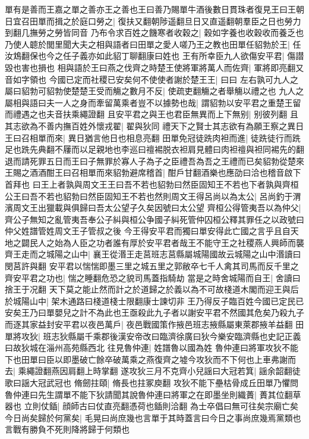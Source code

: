 單有是善而王嘉之單之善亦王之善也王曰善乃賜單牛酒後數日貫珠者復見王曰王朝日宜召田單而揖之於庭口勞之|{
	復扶又翻朝陟遥翻旦日又直遥翻朝羣臣之日也勞力到翻几撫勞之勞皆同音}
乃布令求百姓之饑寒者收穀之|{
	穀如字養也收穀收而養乏也}
乃使人聼於閭里聞大夫之相與語者曰田單之愛人嗟乃王之教也田單任貂勃於王|{
	任汝鴆翻保也今之任子義亦如此貂丁聊翻康曰姓也}
王有所幸臣九人欲傷安平君|{
	傷譛毀也害也損也}
相與語於王曰燕之伐齊之時楚王使將軍將萬人而佐齊|{
	軍將即亮翻又音如字領也}
今國已定而社稷已安矣何不使使者謝於楚王王|{
	曰曰}
左右孰可九人之屬曰貂勃可貂勃使楚楚王受而觴之數月不反|{
	使疏吏翻觴之者舉觴以禮之也}
九人之屬相與語曰夫一人之身而牽留萬乘者豈不以據勢也哉|{
	謂貂勃以安平君之重楚王留而禮遇之也夫音扶乘繩證翻}
且安平君之與王也君臣無異而上下無别|{
	别彼列翻}
且其志欲為不善内撫百姓外懷戎翟|{
	翟與狄同}
禮天下之賢士其志欲有為願王察之異日王曰召相單而來|{
	異日猶言他日也相息亮翻}
田單免冠徒跣肉袒而進|{
	徒跣徒行而跣足也跣先典翻不屨而以足親地也李巡曰䄠裼脱衣袒肩見體曰肉袒䄠與袒同裼先的翻}
退而請死罪五日而王曰子無罪於寡人子為子之臣禮吾為吾之王禮而已矣貂勃從楚來王賜之酒酒酣王曰召相單而來貂勃避席稽首|{
	酣戶甘翻酒樂也應劭曰洽也稽音啟下首拜也}
曰王上者孰與周文王王曰吾不若也貂勃曰然臣固知王不若也下者孰與齊桓公王曰吾不若也貂勃曰然臣固知王不若也然則周文王得呂尚以為太公|{
	呂尚釣于渭濱周文王出獵載與俱歸曰吾太公望子久矣因號曰太公望}
齊桓公得管夷吾以為仲父|{
	齊公子無知之亂管夷吾奉公子糾與桓公争國子糾死管仲囚桓公釋其罪任之以政號曰仲父姓譜管姓周文王子管叔之後}
今王得安平君而獨曰單安得此亡國之言乎且自天地之闢民人之始為人臣之功者誰有厚於安平君者哉王不能守王之社稷燕人興師而襲齊王走而之城陽之山中|{
	襄王從湣王走莒班志莒縣屬城陽國故云城陽之山中湣讀曰閔莒許與翻}
安平君以惴惴即墨三里之城五里之郭敝卒七千人禽其司馬而反千里之齊安平君之功也|{
	惴之睡翻危恐之貌司馬蓋指騎劫}
當是之時舍城陽而自王|{
	舍讀曰捨王于况翻}
天下莫之能止然而計之於道歸之於義以為不可故棧道木閣而迎王與后於城陽山中|{
	架木通路曰棧道棧士限翻康士諫切非}
王乃得反子臨百姓今國已定民已安矣王乃曰單嬰兒之計不為此也王亟殺此九子者以謝安平君不然國其危矣乃殺九子而逐其家益封安平君以夜邑萬戶|{
	夜邑戰國策作掖邑班志掖縣屬東萊郡掖羊益翻}
田單將攻狄|{
	班志狄縣屬千乘郡後漢安帝改曰臨濟徐廣曰狄今樂安臨濟縣也史記正義曰故狄城在淄州高苑縣西北}
往見魯仲連|{
	姓譜魯以國為姓}
魯仲連曰將軍攻狄不能下也田單曰臣以即墨破亡餘卒破萬乘之燕復齊之墟今攻狄而不下何也上車弗謝而去|{
	乘繩證翻燕因肩翻上時掌翻}
遂攻狄三月不克齊小兒謡曰大冠若箕|{
	謡余韶翻徒歌曰謡大冠武冠也}
脩劒拄頤|{
	脩長也拄冢庾翻}
攻狄不能下壘枯骨成丘田單乃懼問魯仲連曰先生謂單不能下狄請聞其說魯仲連曰將軍之在即墨坐則織蕢|{
	蕢其位翻草器也}
立則仗鍤|{
	顔師古曰仗直亮翻憑荷也鍤則洽翻}
為士卒倡曰無可往矣宗廟亡矣今日尚矣歸於何黨矣|{
	毛晃曰尚庶幾也言單于其時蓋言曰今日之事尚庶幾焉黨類也言戰有勝負不死則降將歸于何類也}

